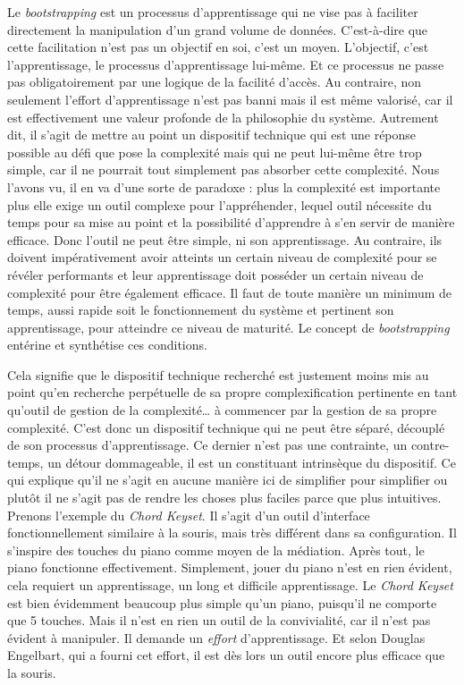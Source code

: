 \documentclass{FramateX}
\begin{document}
\begin{refsection}
Le \textit{bootstrapping} est un processus d'apprentissage qui ne vise pas à
faciliter directement la manipulation d'un grand volume de données.
C'est-à-dire que cette facilitation n'est pas un objectif en soi, c'est
un moyen. L'objectif, c'est l'apprentissage, le processus
d'apprentissage lui-même. Et ce processus ne passe pas obligatoirement
par une logique de la facilité d'accès. Au contraire, non
seulement l'effort d'apprentissage n'est pas banni mais il est même
valorisé, car il est effectivement une valeur profonde de la
philosophie du système. Autrement dit, il s'agit de mettre au point un
dispositif technique qui est une réponse possible au défi que pose la
complexité mais qui ne peut lui-même être trop simple, car il ne
pourrait tout simplement pas absorber cette complexité. Nous l'avons
vu, il en va d'une sorte de paradoxe : plus la complexité est
importante plus elle exige un outil complexe pour
l'appréhender, lequel outil nécessite du temps pour sa mise au point et
la possibilité d'apprendre à s'en servir de manière efficace. Donc
l'outil ne peut être simple, ni son apprentissage. Au contraire, ils
doivent impérativement avoir atteints un certain niveau de
complexité pour se révéler performants et leur apprentissage doit
 posséder un certain niveau de complexité pour être également
efficace. Il faut de toute manière un minimum de temps, aussi rapide
soit le fonctionnement du système et pertinent son apprentissage, pour
atteindre ce niveau de maturité. Le concept de \textit{bootstrapping} entérine
et synthétise ces conditions.

Cela signifie que le dispositif technique recherché est justement
moins mis au point qu'en recherche perpétuelle de sa propre
complexification pertinente en tant qu'outil de gestion de la
complexité… à commencer par la gestion de sa propre complexité. C'est
donc un dispositif technique qui ne peut être séparé, découplé de son
processus d'apprentissage. Ce dernier n'est pas une contrainte, un
contre-temps, un détour dommageable, il est un constituant intrinsèque
du dispositif. Ce qui explique qu'il ne s'agit en aucune manière ici de
simplifier pour simplifier ou plutôt il ne s'agit pas de rendre les
choses plus faciles parce que plus intuitives. Prenons l'exemple du
\textit{Chord Keyset}. Il s'agit d'un outil d'interface fonctionnellement
similaire à la souris, mais très différent dans sa configuration. Il
s'inspire des touches du piano comme moyen de la médiation. Après tout,
le piano fonctionne effectivement. Simplement, jouer du piano n'est en
rien évident, cela requiert un apprentissage, un long et difficile
apprentissage. Le \textit{Chord Keyset} est bien évidemment beaucoup plus
simple qu'un piano, puisqu'il ne comporte que 5 touches. Mais il n'est
en rien un outil de la convivialité, car il n'est pas évident à
manipuler. Il demande un \textit{effort} d'apprentissage. Et selon
Douglas Engelbart, qui a fourni cet effort, il est dès lors un outil
encore plus efficace que la souris. 


\end{refsection}
\end{document}
